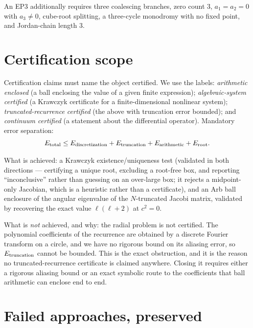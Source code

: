 \documentclass[aps,prd,onecolumn,superscriptaddress,nofootinbib]{revtex4-2}
\begin{document}
An EP3 additionally requires three coalescing branches, zero count $3$,
$a_1=a_2=0$ with $a_3\ne0$, cube-root splitting, a three-cycle monodromy with no
fixed point, and Jordan-chain length $3$.

\section{Certification scope}\label{sec:cert}

Certification claims must name the object certified. We use the labels:
\emph{arithmetic enclosed} (a ball enclosing the value of a given finite
expression); \emph{algebraic-system certified} (a Krawczyk certificate for a
finite-dimensional nonlinear system); \emph{truncated-recurrence certified} (the
above with truncation error bounded); and \emph{continuum certified} (a
statement about the differential operator). Mandatory error separation:
\begin{equation}
  E_{\rm total}\le E_{\rm discretization}+E_{\rm truncation}
  +E_{\rm arithmetic}+E_{\rm root}.
\end{equation}

What is achieved: a Krawczyk existence/uniqueness test (validated in both
directions --- certifying a unique root, excluding a root-free box, and
reporting ``inconclusive'' rather than guessing on an over-large box; it rejects
a midpoint-only Jacobian, which is a heuristic rather than a certificate), and
an Arb ball enclosure of the angular eigenvalue of the $N$-truncated Jacobi
matrix, validated by recovering the exact value $\ell(\ell+2)$ at $c^2=0$.

What is \emph{not} achieved, and why: the radial problem is not certified. The
polynomial coefficients of the recurrence are obtained by a discrete Fourier
transform on a circle, and we have no rigorous bound on its aliasing error, so
$E_{\rm truncation}$ cannot be bounded. This is the exact obstruction, and it is
the reason no truncated-recurrence certificate is claimed anywhere. Closing it
requires either a rigorous aliasing bound or an exact symbolic route to the
coefficients that ball arithmetic can enclose end to end.

\section{Failed approaches, preserved}\label{sec:failed}
\end{document}
